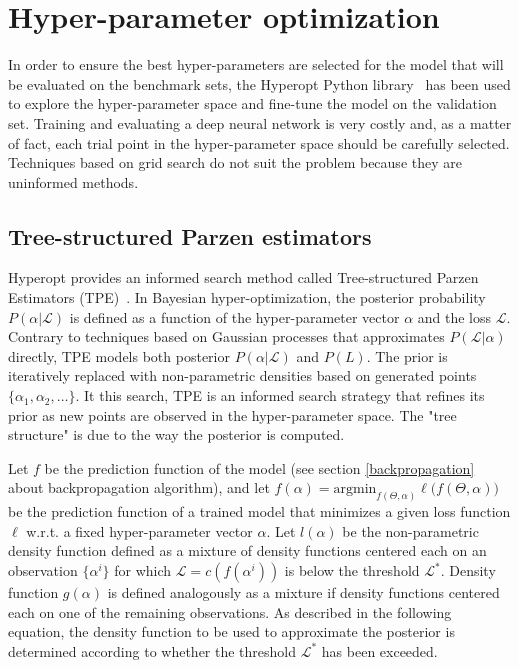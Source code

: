 \section{Hyper-parameter optimization}

  In order to ensure the best hyper-parameters are selected for the model that will be evaluated
  on the benchmark sets, the Hyperopt Python library~\cite{Bergstra_2015} has been used to explore
  the hyper-parameter space and fine-tune the model on the validation set.
  Training and evaluating a deep neural network is very costly and, as a matter of fact,
  each trial point in the hyper-parameter space should be carefully selected. Techniques based
  on grid search do not suit the problem because they are uninformed methods.

\subsection{Tree-structured Parzen estimators}

  Hyperopt provides an informed search method called Tree-structured Parzen Estimators (TPE)~\cite{bergstra2011algorithms}.
  In Bayesian hyper-optimization, the posterior probability $P(\alpha \vert \mathcal L)$ is defined as a function
  of the hyper-parameter vector $\alpha$ and the loss $\mathcal L$. Contrary to techniques based on Gaussian processes
  that approximates $P(\mathcal L \vert \alpha)$ directly, TPE models both posterior $P(\alpha \vert \mathcal L)$ and $P(L)$.
  The prior is iteratively replaced with non-parametric densities based on generated points $\{ \alpha_1, \alpha_2, \dotsc \}$.
  It this search, TPE is an informed search strategy that refines its prior as new points are observed in the
  hyper-parameter space. The "tree structure" is due to the way the posterior is computed.

  Let $f$ be the prediction function of the model (see section \ref{backpropagation} about backpropagation algorithm),
  and let $f(\alpha) = \text{argmin}_{f(\Theta, \alpha)} \ell \big(f(\Theta, \alpha)\big)$ be the prediction function
  of a trained model that minimizes a given loss function $\ell$ w.r.t. a fixed hyper-parameter vector $\alpha$.
  Let $l(\alpha)$ be the non-parametric density function defined as a mixture of density functions centered each on an
  observation $\{ \alpha^{i} \}$ for which $\mathcal L = c(f(\alpha^{i}))$ is below the threshold $\mathcal L^*$.
  Density function $g(\alpha)$ is defined analogously as a mixture if density functions centered each on one of the
  remaining observations.
  As described in the following equation, the density function to be used to approximate the posterior is
  determined according to whether the threshold $\mathcal L^*$ has been exceeded.


